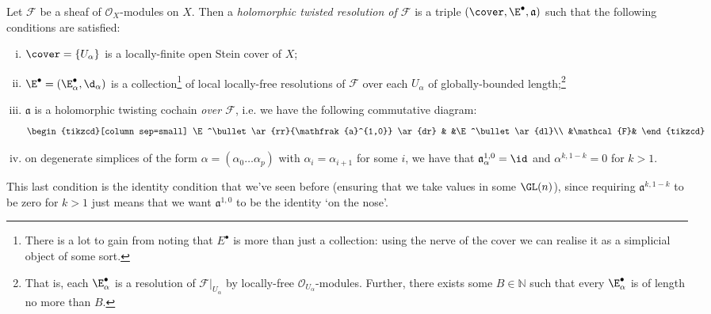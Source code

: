         \begin{definition}
            Let $\mathcal{F}$ be a sheaf of $\mathcal{O}_X$-modules on $X$.
            Then a \textit{holomorphic twisted resolution of $\mathcal{F}$} is a triple $(\cover,\E^\bullet,\mathfrak{a})$ such that the following conditions are satisfied:
            \begin{enumerate}[(i)]
                \item $\cover=\{U_\alpha\}$ is a locally-finite open Stein cover of $X$;
                \item $\E^\bullet=(\E^\bullet_\alpha,\d_\alpha)$ is a collection\footnote{There is a lot to gain from noting that $E^\bullet$ is more than just a collection: using the nerve of the cover we can realise it as a simplicial object of some sort.} of local locally-free resolutions of $\mathcal{F}$ over each $U_\alpha$ of globally-bounded length;\footnote{That is, each $\E^\bullet_\alpha$ is a resolution of $\mathcal{F}|_{U_\alpha}$ by locally-free $\mathcal{O}_{U_\alpha}$-modules. Further, there exists some $B\in\mathbb{N}$ such that every $\E^\bullet_\alpha$ is of length no more than $B$.}
                \item $\mathfrak{a}$ is a holomorphic twisting cochain \textit{over $\mathcal{F}$}, i.e. we have the following commutative diagram:
                    \begin{equation*}
                        \begin{tikzcd}[column sep=small]
                            \E^\bullet
                                \ar{rr}{\mathfrak{a}^{1,0}}
                                \ar{dr}
                            &
                            &\E^\bullet
                                \ar{dl}\\
                            &\mathcal{F}&
                        \end{tikzcd}
                    \end{equation*}
                \item on degenerate simplices of the form $\alpha=(\alpha_0\ldots\alpha_p)$ with $\alpha_i=\alpha_{i+1}$ for some $i$, we have that $\mathfrak{a}^{1,0}_\alpha=\id$ and $\alpha^{k,1-k}=0$ for $k>1$.\qedhere
            \end{enumerate}
        \end{definition}
        This last condition is the identity condition that we've seen before (ensuring that we take values in some $\GL(n)$), since requiring $\mathfrak{a}^{k,1-k}$ to be zero for $k>1$ just means that we want $\mathfrak{a}^{1,0}$ to be the identity `on the nose'.

